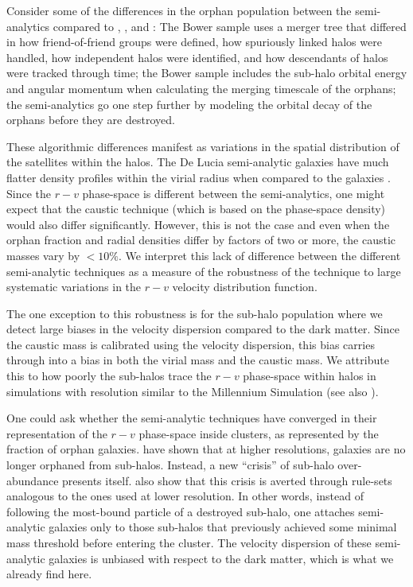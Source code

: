\documentclass[iop]{emulateapj}
\begin{document}
Consider some of the differences in the orphan population between the \citet{Bower06} semi-analytics compared to \citet{Delucia07}, \citet{Bertone07}, and \citet{Guo11}: The Bower sample uses a merger tree that differed in how friend-of-friend groups were defined, how spuriously linked halos were handled, how independent halos were identified, and how descendants of halos were tracked through time; the Bower sample includes the sub-halo orbital energy and angular momentum when calculating the merging timescale of the orphans; the \citet{Guo11} semi-analytics go one step further by modeling the orbital decay of the orphans before they are destroyed. 

These algorithmic differences manifest as variations in the spatial distribution of the satellites within the halos. The De Lucia semi-analytic galaxies have much flatter density profiles within the virial radius when compared to the \citet{Bower06} galaxies \citep{Budzynski12}.  Since the $r-v$ phase-space is different between the semi-analytics, one might expect that the caustic technique (which is based on the phase-space density) would also differ significantly. However, this is not the case and even when the orphan fraction and radial densities differ by factors of two or more, the caustic masses vary by $< 10\%$. We interpret this lack of difference between the different semi-analytic techniques as a measure of the robustness of the technique to large systematic variations in the $r-v$ velocity distribution function.

The one exception to this robustness is for the sub-halo population where we detect large biases in the velocity dispersion compared to the dark matter. Since the caustic mass is calibrated using the velocity dispersion, this bias carries through into a bias in both the virial mass and the caustic mass. We attribute this to how poorly the sub-halos trace the $r-v$ phase-space within halos in simulations with resolution similar to the Millennium Simulation (see also \citet{Budzynski12}). 

One could ask whether the semi-analytic techniques have converged in their representation of the $r-v$ phase-space inside clusters, as represented by the fraction of orphan galaxies. \citet{Faltenbacher06} have shown that at higher resolutions, galaxies are no longer orphaned from sub-halos. Instead, a new ``crisis'' of sub-halo over-abundance presents itself. \citet{Faltenbacher06} also show that this crisis is averted through rule-sets analogous to the ones used at lower resolution. In other words, instead of following the most-bound particle of a destroyed sub-halo, one attaches semi-analytic galaxies only to those sub-halos that previously achieved some minimal mass threshold before entering the cluster. The velocity dispersion of these semi-analytic galaxies is unbiased with respect to the dark matter, which is what we already find here.
\end{document}
